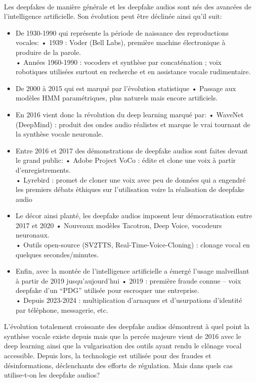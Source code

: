 \documentclass[memoire, 12pt]{report}
\begin{document}
\paragraph{}
Les deepfakes de manière générale et les deepfake audios sont nés des avancées de l'intelligence artificielle. Son évolution peut être déclinée ainsi qu'il suit:
\begin{itemize}
    \item De 1930-1990 qui représente la période de naissance des reproductions vocales:
    •	1939 : Voder (Bell Labs), première machine électronique à produire de la parole.\\
	•	Années 1960-1990 : vocoders et synthèse par concaténation ; voix robotiques utilisées surtout en recherche et en assistance vocale rudimentaire.

    \item De 2000 à 2015 qui est marqué par l'évolution statistique
	•	Passage aux modèles HMM paramétriques, plus naturels mais encore artificiels.

    \item En 2016 vient donc la révolution du deep learning marqué par:
	•	WaveNet (DeepMind) : produit des ondes audio réalistes et marque le vrai tournant de la synthèse vocale neuronale.

     \item Entre 2016 et 2017 des démonstrations de deepfake audios sont faites devant le grand public:
	•	Adobe Project VoCo : édite et clone une voix à partir d’enregistrements.\\
	•	Lyrebird : promet de cloner une voix avec peu de données qui a engendré les premiers débats éthiques sur l'utilisation voire la réalisation de deepfake audio

    \item Le décor ainsi planté, les deepfake audios imposent leur démocratisation entre 2017 et 2020
	•	Nouveaux modèles Tacotron, Deep Voice, vocodeurs neuronaux.\\
	•	Outils open-source (SV2TTS, Real-Time-Voice-Cloning) : clonage vocal en quelques secondes/minutes.

\item Enfin, avec la montée de l'intelligence artificielle a émergé l'usage malveillant à partir de 2019 jusqu'aujourd'hui
	•	2019 : première fraude connue – voix deepfake d’un “PDG” utilisée pour escroquer une entreprise.\\
	•	Depuis 2023-2024 : multiplication d’arnaques et d’usurpations d’identité par téléphone, messagerie, etc.
\end{itemize}
L'évolution totalement croissante des deepfake audios démontrent à quel point la synthèse vocale existe depuis mais que la percée majeure vient de 2016 avec le deep learning  ainsi que la vulgarisation des outils ayant rendu le clônage vocal accessible. Depuis lors, la technologie est utilisée pour des fraudes et désinformations, déclenchants des efforts de régulation.  Mais dans quels cas utilise-t-on les deepfake audios? 
\end{document}
